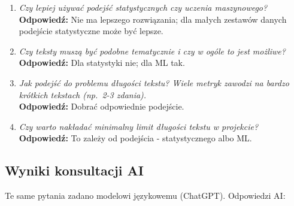 \begin{enumerate}
	\item \textit{Czy lepiej używać podejść statystycznych czy uczenia maszynowego?}\\
	\textbf{Odpowiedź:} Nie ma lepszego rozwiązania; dla małych zestawów danych podejście statystyczne może być lepsze.

	\item \textit{Czy teksty muszą być podobne tematycznie i czy w ogóle to jest możliwe?}\\
	\textbf{Odpowiedź:} Dla statystyki nie; dla ML tak.

	\item \textit{Jak podejść do problemu długości tekstu? Wiele metryk zawodzi na bardzo krótkich tekstach (np.\ 2-3 zdania).}\\
	\textbf{Odpowiedź:} Dobrać odpowiednie podejście.

	\item \textit{Czy warto nakładać minimalny limit długości tekstu w projekcie?}\\
	\textbf{Odpowiedź:} To zależy od podejścia - statystycznego albo ML.
\end{enumerate}

\subsection{Wyniki konsultacji AI}

Te same pytania zadano modelowi językowemu (ChatGPT). Odpowiedzi AI:

